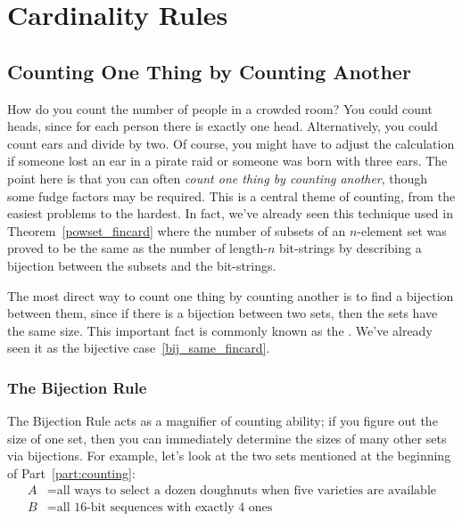 \chapter{Cardinality Rules}\label{counting_chap}

\newcommand{\Jay}{Bob}
\newcommand{\Jer}{Ted}

\section{Counting One Thing by Counting Another}\label{bijection_counting_sec}

How do you count the number of people in a crowded room?  You could
count heads, since for each person there is exactly one head.
Alternatively, you could count ears and divide by two.  Of course, you
might have to adjust the calculation if someone lost an ear in a
pirate raid or someone was born with three ears.  The point here is
that you can often \emph{count one thing by counting another}, though
some fudge factors may be required.  This is a central theme of
counting, from the easiest problems to the hardest.  In fact, we've
already seen this technique used in Theorem~\ref{powset_fincard} where
the number of subsets of an $n$-element set was proved to be the same as
the number of length-$n$ bit-strings by describing a bijection
between the subsets and the bit-strings.

The most direct way to count one thing by counting another is to find
a bijection between them, since if there is a bijection between two
sets, then the sets have the same size.  This important fact is
commonly known as the .  We've already seen it as
the  bijective case~\eqref{bij_same_fincard}.

\subsection{The Bijection Rule}

\iffalse
\begin{rul}[Bijection Rule]\label{rul:bijection}
If there is a bijection $f: A \to B$ between $A$ and~$B$, then
$\card{A} = \card{B}$.
\end{rul}
\fi

The Bijection Rule acts as a magnifier of counting ability; if you
figure out the size of one set, then you can immediately determine the
sizes of many other sets via bijections.  For example, let's look at
the two sets mentioned at the beginning of Part~\ref{part:counting}:
%
\begin{align*}
A & = \text{all ways to select a dozen doughnuts when five varieties are available} \\
B & = \text{all 16-bit sequences with exactly 4 ones}
\end{align*}

